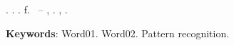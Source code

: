 
\begin{resumo}[ABSTRACT]
\begin{SingleSpacing}

\imprimirautorcitacao. \imprimirtitleabstract. \imprimirdata. \pageref {LastPage} f. \imprimirprojeto\ – \imprimirprograma, \imprimirinstituicao. \imprimirlocal, \imprimirdata.\\

\lipsum[1] %

\textbf{Keywords}: Word01. Word02. Pattern recognition. 

\end{SingleSpacing}
\end{resumo}



